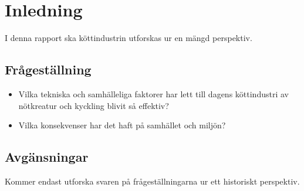 \section{Inledning}
I denna rapport ska köttindustrin utforskas ur en mängd perspektiv.

\subsection{Frågeställning}
\begin{itemize}
	\item Vilka tekniska och samhälleliga faktorer har lett till dagens köttindustri av nötkreatur och kyckling blivit så effektiv?
	\item Vilka konsekvenser har det haft på samhället och miljön?
\end{itemize}

\subsection{Avgänsningar}
Kommer endast utforska svaren på frågeställningarna ur ett historiskt perspektiv. 